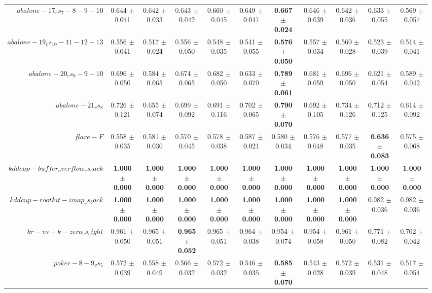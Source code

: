 \begin{table}[!ht]
{\begin{tabular}{r c c c c c c c c c c}
$abalone-17_vs_7-8-9-10$ & 0.644 $\pm$ 0.041 & 0.642 $\pm$ 0.033 & 0.643 $\pm$ 0.042 & 0.660 $\pm$ 0.045 & 0.649 $\pm$ 0.047 & \textbf{0.667 $\pm$ 0.024} & 0.646 $\pm$ 0.039 & 0.642 $\pm$ 0.036 & 0.633 $\pm$ 0.055 & 0.569 $\pm$ 0.057 \\
$abalone-19_vs_10-11-12-13$ & 0.556 $\pm$ 0.041 & 0.517 $\pm$ 0.024 & 0.556 $\pm$ 0.050 & 0.548 $\pm$ 0.035 & 0.541 $\pm$ 0.055 & \textbf{0.576 $\pm$ 0.050} & 0.557 $\pm$ 0.034 & 0.560 $\pm$ 0.028 & 0.523 $\pm$ 0.039 & 0.514 $\pm$ 0.041 \\
$abalone-20_vs_8-9-10$ & 0.696 $\pm$ 0.050 & 0.584 $\pm$ 0.065 & 0.674 $\pm$ 0.065 & 0.682 $\pm$ 0.050 & 0.633 $\pm$ 0.070 & \textbf{0.789 $\pm$ 0.061} & 0.681 $\pm$ 0.059 & 0.696 $\pm$ 0.050 & 0.621 $\pm$ 0.054 & 0.589 $\pm$ 0.042 \\
$abalone-21_vs_8$ & 0.726 $\pm$ 0.121 & 0.655 $\pm$ 0.074 & 0.699 $\pm$ 0.092 & 0.691 $\pm$ 0.116 & 0.702 $\pm$ 0.065 & \textbf{0.790 $\pm$ 0.070} & 0.692 $\pm$ 0.105 & 0.734 $\pm$ 0.126 & 0.712 $\pm$ 0.125 & 0.614 $\pm$ 0.092 \\
$flare-F$ & 0.558 $\pm$ 0.035 & 0.581 $\pm$ 0.030 & 0.570 $\pm$ 0.045 & 0.578 $\pm$ 0.038 & 0.587 $\pm$ 0.021 & 0.580 $\pm$ 0.034 & 0.576 $\pm$ 0.048 & 0.577 $\pm$ 0.035 & \textbf{0.636 $\pm$ 0.083} & 0.575 $\pm$ 0.068 \\
$kddcup-buffer_overflow_vs_back$ & \textbf{1.000 $\pm$ 0.000} & \textbf{1.000 $\pm$ 0.000} & \textbf{1.000 $\pm$ 0.000} & \textbf{1.000 $\pm$ 0.000} & \textbf{1.000 $\pm$ 0.000} & \textbf{1.000 $\pm$ 0.000} & \textbf{1.000 $\pm$ 0.000} & \textbf{1.000 $\pm$ 0.000} & \textbf{1.000 $\pm$ 0.000} & \textbf{1.000 $\pm$ 0.000} \\
$kddcup-rootkit-imap_vs_back$ & \textbf{1.000 $\pm$ 0.000} & \textbf{1.000 $\pm$ 0.000} & \textbf{1.000 $\pm$ 0.000} & \textbf{1.000 $\pm$ 0.000} & \textbf{1.000 $\pm$ 0.000} & \textbf{1.000 $\pm$ 0.000} & \textbf{1.000 $\pm$ 0.000} & \textbf{1.000 $\pm$ 0.000} & 0.982 $\pm$ 0.036 & 0.982 $\pm$ 0.036 \\
$kr-vs-k-zero_vs_eight$ & 0.961 $\pm$ 0.050 & 0.965 $\pm$ 0.051 & \textbf{0.965 $\pm$ 0.052} & 0.965 $\pm$ 0.051 & 0.964 $\pm$ 0.038 & 0.954 $\pm$ 0.074 & 0.954 $\pm$ 0.058 & 0.961 $\pm$ 0.050 & 0.771 $\pm$ 0.082 & 0.702 $\pm$ 0.042 \\
$poker-8-9_vs_5$ & 0.572 $\pm$ 0.039 & 0.558 $\pm$ 0.049 & 0.566 $\pm$ 0.032 & 0.572 $\pm$ 0.032 & 0.546 $\pm$ 0.035 & \textbf{0.585 $\pm$ 0.070} & 0.543 $\pm$ 0.028 & 0.572 $\pm$ 0.039 & 0.531 $\pm$ 0.048 & 0.517 $\pm$ 0.054 \\

\end{tabular}}
\end{table}
